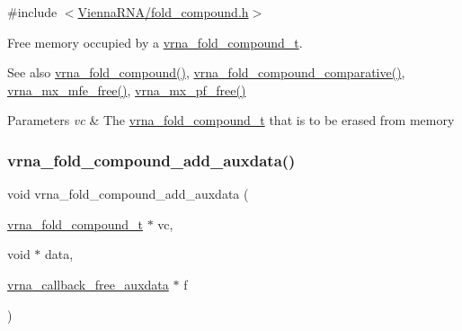 {\ttfamily \#include $<$\hyperlink{fold__compound_8h}{Vienna\+R\+N\+A/fold\+\_\+compound.\+h}$>$}



Free memory occupied by a \hyperlink{group__fold__compound_ga1b0cef17fd40466cef5968eaeeff6166}{vrna\+\_\+fold\+\_\+compound\+\_\+t}. 

\begin{DoxySeeAlso}{See also}
\hyperlink{group__fold__compound_ga6601d994ba32b11511b36f68b08403be}{vrna\+\_\+fold\+\_\+compound()}, \hyperlink{group__fold__compound_gad6bacc816af274922b13d947f708aa0c}{vrna\+\_\+fold\+\_\+compound\+\_\+comparative()}, \hyperlink{group__dp__matrices_ga6a9422feb5dfe5c64050cebf447672d0}{vrna\+\_\+mx\+\_\+mfe\+\_\+free()}, \hyperlink{group__dp__matrices_ga2283e69fd139fb8e58d7ade3b5773f9c}{vrna\+\_\+mx\+\_\+pf\+\_\+free()}
\end{DoxySeeAlso}

\begin{DoxyParams}{Parameters}
{\em vc} & The \hyperlink{group__fold__compound_ga1b0cef17fd40466cef5968eaeeff6166}{vrna\+\_\+fold\+\_\+compound\+\_\+t} that is to be erased from memory \\
\hline
\end{DoxyParams}
\mbox{\label{group__fold__compound_ga6316a9426bea2f742375e8df6febd3f6}} 
\subsubsection{\texorpdfstring{vrna\+\_\+fold\+\_\+compound\+\_\+add\+\_\+auxdata()}{vrna\_fold\_compound\_add\_auxdata()}}
{\footnotesize\ttfamily void vrna\+\_\+fold\+\_\+compound\+\_\+add\+\_\+auxdata (\begin{DoxyParamCaption}\item[{\hyperlink{group__fold__compound_ga1b0cef17fd40466cef5968eaeeff6166}{vrna\+\_\+fold\+\_\+compound\+\_\+t} $\ast$}]{vc,  }\item[{void $\ast$}]{data,  }\item[{\hyperlink{group__fold__compound_ga7806651f51b195013839a218b3bbd5a3}{vrna\+\_\+callback\+\_\+free\+\_\+auxdata} $\ast$}]{f }\end{DoxyParamCaption})}



